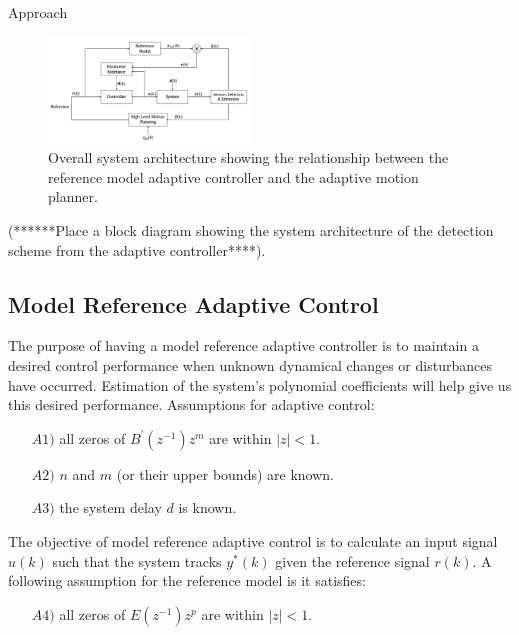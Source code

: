 
\begin{section}{Approach}
\label{sec:approach}


\begin{figure}
\vspace{1pt}
\centering
\includegraphics[width=0.48\textwidth]{sys_arch.png}
\caption{Overall system architecture showing the relationship between the reference model adaptive controller and the adaptive motion planner.}
\label{fig:system_arch}
\end{figure}

(******Place a block diagram showing the system architecture of the detection scheme from the adaptive controller****).

\subsection{Model Reference Adaptive Control}
The purpose of having a model reference adaptive controller is to maintain a desired control performance when unknown dynamical changes or disturbances have occurred. Estimation of the system's polynomial coefficients will help give us this desired performance.
Assumptions for adaptive control: 
	\begin{enumerate}[leftmargin=4\parindent]
	\item[$A1)$] all zeros of $B^{'}(z^{-1})z^m$ are within $|z|<1$. 
	\item[$A2)$] $n$ and $m$ (or their upper bounds) are known. 
	\item[$A3)$] the system delay $d$ is known.
	\end{enumerate}
The objective of model reference adaptive control is to calculate an input signal $u(k)$ such that the system tracks $y^{*}(k)$ given the reference signal $r(k)$. 
A following assumption for the reference model is it satisfies:
    \begin{enumerate}[leftmargin=4\parindent]
	\item[$A4)$] all zeros of $E(z^{-1})z^p$ are within $|z|<1$. 
	\end{enumerate}


\end{section}
